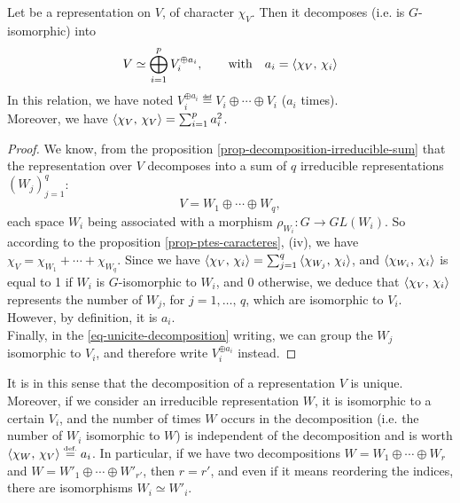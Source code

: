  
\begin{prop}
\label{unicite-decomposition-prop}
\label{notation-90} Let be a representation on $V$, of character $ \chi_V $. Then it decomposes (i.e. is $G$-isomorphic) into
\begin{equation}
\label{eq-decomposition-representation}
V \simeq \bigoplus_{i = 1}^p{V_i^{\oplus a_i}}, \qquad \text{with} \quad a_i = \langle \chi_V,\,\chi_i\rangle
\end{equation}
In this relation, we have noted $ V_i^{\oplus a_i} \eqdef V_i \oplus \cdots \oplus V_i $ ($ a_i $ times). \\Moreover, we have $ \langle \chi_V,\,\chi_V \rangle = \sum_{i = 1}^p{a_i^2} $.
\end{prop}
\begin{proof}
We know, from the proposition \ref{prop-decomposition-irreducible-sum} that the representation over $V$ decomposes into a sum of $ q $ irreducible representations $ (W_j)_{j = 1}^q $:
\begin{equation}
\label{eq-unicite-decomposition}
V = W_1 \oplus \cdots \oplus W_q,
\end{equation}
each space $ W_i $ being associated with a morphism $ \rho_{W_i}: G \rightarrow GL (W_i) $. So according to the proposition \ref{prop-ptes-caracteres}, (iv), we have $ \chi_V = \chi_{W_1} + \cdots + \chi_{W_q} $. Since we have $ \langle \chi_V,\,\chi_i\rangle = \sum_{j = 1}^{q}{\langle \chi_{W_j},\,\chi_i\rangle} $, and $ \langle \chi_{W_i},\,\chi_i\rangle $ is equal to 1 if $ W_i $ is $G$-isomorphic to $ W_i $, and 0 otherwise, we deduce that $ \langle \chi_V,\,\chi_i\rangle $ represents the number of $ W_j $, for $ j = 1, \ldots, \, q $, which are isomorphic to $ V_i $. However, by definition, it is $ a_i $. \\Finally, in the \eqref{eq-unicite-decomposition} writing, we can group the $ W_j $ isomorphic to $ V_i $, and therefore write $ V_i^{ \oplus a_i} $ instead.
\end{proof}
 
 
\begin{rem}
It is in this sense that the decomposition of a representation $V$ is unique. Moreover, if we consider an irreducible representation $ W $, it is isomorphic to a certain $ V_i $, and the number of times $ W $ occurs in the decomposition (i.e. the number of $ W_i $ isomorphic to $ W $) is independent of the decomposition and is worth $ \langle \chi_W,\,\chi_V\rangle \stackrel{\mbox{\upshape\tiny def.}}{=} a_i $. In particular, if we have two decompositions $ W = W_1 \oplus \cdots \oplus W_r $ and $ W = W'_1 \oplus \cdots \oplus W'_{r'} $, then $ r = r'$, and even if it means reordering the indices, there are isomorphisms $ W_i \simeq W'_i $.
\end{rem}
 
